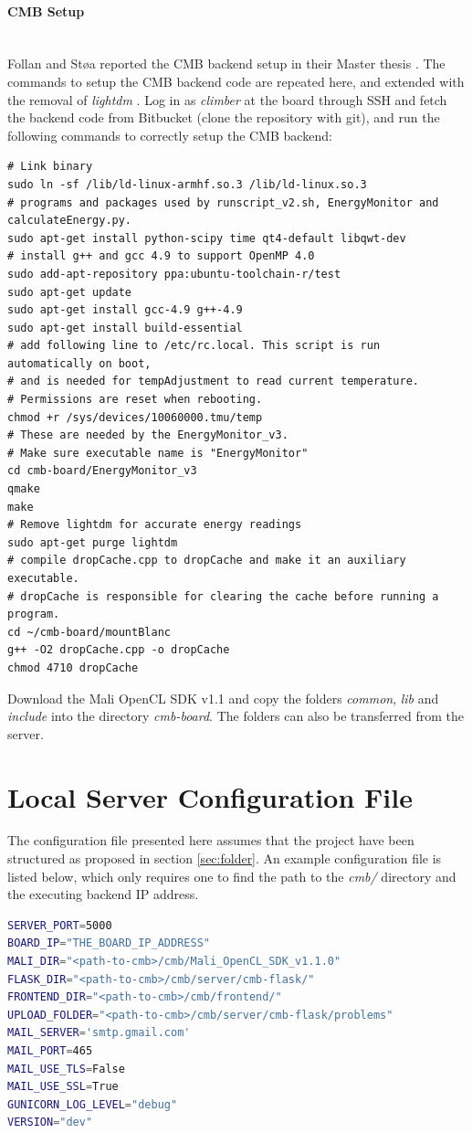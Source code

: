\paragraph*{CMB Setup} \hfill \\
Follan and Støa reported the CMB backend setup in their Master thesis \cite{mt:T&S}. The commands to setup the CMB backend code are repeated here, and extended with the removal of \textit{lightdm} \cite{m:lightdm}. Log in as \textit{climber} at the board through SSH and fetch the backend code from Bitbucket (clone the repository with git), and run the following commands to correctly setup the CMB backend: \\

\begin{lstlisting}
# Link binary
sudo ln -sf /lib/ld-linux-armhf.so.3 /lib/ld-linux.so.3
# programs and packages used by runscript_v2.sh, EnergyMonitor and
calculateEnergy.py.
sudo apt-get install python-scipy time qt4-default libqwt-dev
# install g++ and gcc 4.9 to support OpenMP 4.0
sudo add-apt-repository ppa:ubuntu-toolchain-r/test
sudo apt-get update
sudo apt-get install gcc-4.9 g++-4.9
sudo apt-get install build-essential
# add following line to /etc/rc.local. This script is run automatically on boot,
# and is needed for tempAdjustment to read current temperature.
# Permissions are reset when rebooting.
chmod +r /sys/devices/10060000.tmu/temp
# These are needed by the EnergyMonitor_v3.
# Make sure executable name is "EnergyMonitor"
cd cmb-board/EnergyMonitor_v3
qmake
make
# Remove lightdm for accurate energy readings
sudo apt-get purge lightdm
# compile dropCache.cpp to dropCache and make it an auxiliary executable.
# dropCache is responsible for clearing the cache before running a program.
cd ~/cmb-board/mountBlanc
g++ -O2 dropCache.cpp -o dropCache
chmod 4710 dropCache
\end{lstlisting}
Download the Mali OpenCL SDK v1.1 and copy the folders \textit{common}, \textit{lib} and \textit{include} into the directory \textit{cmb-board}. The folders can also be transferred from the server.

\section{Local Server Configuration File}
\label{sec:server-cfg}
The configuration file presented here assumes that the project have been structured as proposed in section \ref{sec:folder}. An example configuration file is listed below, which only requires one to find the path to the \textit{cmb/} directory and the executing backend IP address.

\begin{lstlisting}[language=sh]
SERVER_PORT=5000
BOARD_IP="THE_BOARD_IP_ADDRESS"
MALI_DIR="<path-to-cmb>/cmb/Mali_OpenCL_SDK_v1.1.0"
FLASK_DIR="<path-to-cmb>/cmb/server/cmb-flask/"
FRONTEND_DIR="<path-to-cmb>/cmb/frontend/"
UPLOAD_FOLDER="<path-to-cmb>/cmb/server/cmb-flask/problems"
MAIL_SERVER='smtp.gmail.com'
MAIL_PORT=465
MAIL_USE_TLS=False
MAIL_USE_SSL=True
GUNICORN_LOG_LEVEL="debug"
VERSION="dev"
\end{lstlisting}

